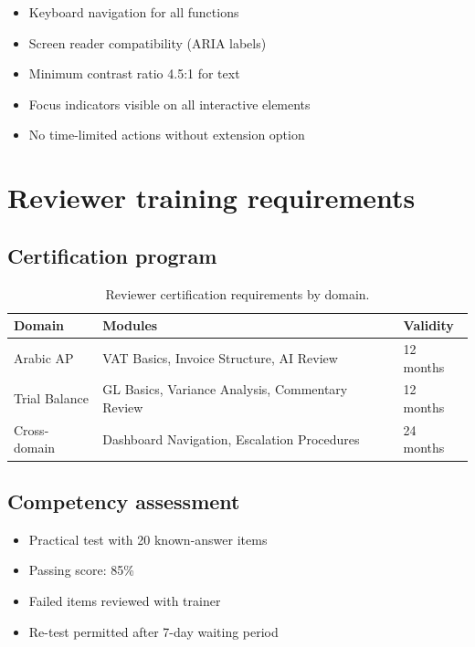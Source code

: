 \documentclass[11pt,a4paper,twoside]{report}
\begin{document}
\begin{itemize}
\item Keyboard navigation for all functions
\item Screen reader compatibility (ARIA labels)
\item Minimum contrast ratio 4.5:1 for text
\item Focus indicators visible on all interactive elements
\item No time-limited actions without extension option
\end{itemize}

\section{Reviewer training requirements}

\subsection{Certification program}

\begin{table}[htbp]
\centering
\caption{Reviewer certification requirements by domain.}
\label{tab:certification}
\footnotesize
\begin{tabularx}{\linewidth}{@{}l l X@{}}
\toprule
\textbf{Domain} & \textbf{Modules} & \textbf{Validity} \\ \midrule
Arabic AP & VAT Basics, Invoice Structure, AI Review & 12 months \\
Trial Balance & GL Basics, Variance Analysis, Commentary Review & 12 months \\
Cross-domain & Dashboard Navigation, Escalation Procedures & 24 months \\
\bottomrule
\end{tabularx}
\end{table}

\subsection{Competency assessment}

\begin{itemize}
\item Practical test with 20 known-answer items
\item Passing score: 85\%
\item Failed items reviewed with trainer
\item Re-test permitted after 7-day waiting period
\end{itemize}
\end{document}
